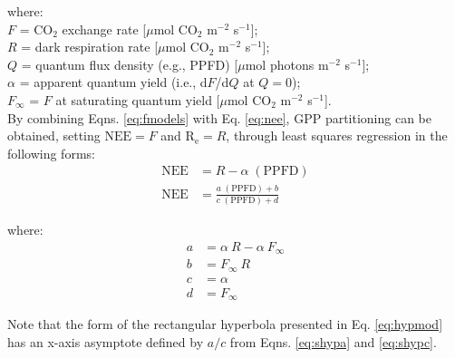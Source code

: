 \noindent where:\\
\indent $F$ = CO$_2$ exchange rate [$\mu$mol CO$_2$ m$^{-2}$ s$^{-1}$];\\
\indent $R$ = dark respiration rate [$\mu$mol CO$_2$ m$^{-2}$ s$^{-1}$];\\
\indent $Q$ = quantum flux density (e.g., PPFD) [$\mu$mol photons m$^{-2}$ s$^{-1}$];\\
\indent $\alpha$ = apparent quantum yield (i.e., d$F$/d$Q$ at $Q=0$);\\
\indent $F_{\infty}$ = $F$ at saturating quantum yield [$\mu$mol CO$_2$ m$^{-2}$ s$^{-1}$].\\

By combining Eqns. \ref{eq:fmodels} with Eq. \ref{eq:nee}, GPP partitioning can be obtained, setting $\text{NEE} = F$ and $\text{R}_{\text{e}} = R$, through least squares regression in the following forms:
\begin{subequations}
\label{eq:neemodels}
\begin{align}
    \text{NEE} &= R - \alpha\; (\text{PPFD}) \label{eq:linmod}\\
    \text{NEE} &= \frac{a\; (\text{PPFD}) + b}
                       {c\; (\text{PPFD}) + d}\label{eq:hypmod}
\end{align}
\end{subequations}

\noindent where:
\begin{subequations}
\label{eq:shyp}
\begin{align}
    a&= \alpha\: R - \alpha\: F_{\infty} \label{eq:shypa}\\
    b&= F_{\infty}\: R \label{eq:shypb}\\
    c&= \alpha \label{eq:shypc}\\
    d&= F_{\infty} \label{eq:shypd}
\end{align}
\end{subequations}

\noindent Note that the form of the rectangular hyperbola presented in Eq. \ref{eq:hypmod} has an x-axis asymptote defined by $a/c$ from Eqns. \ref{eq:shypa} and \ref{eq:shypc}. 

